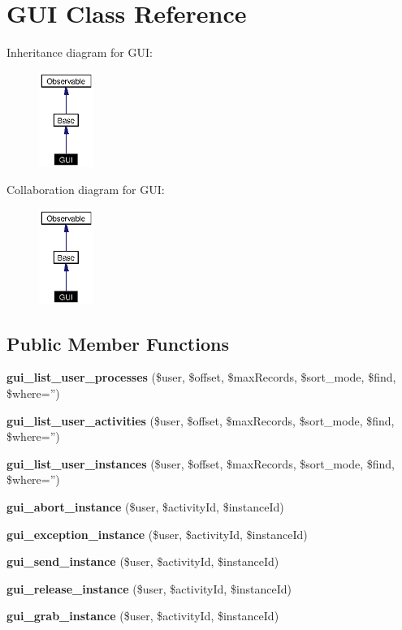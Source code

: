 \section{GUI Class Reference}
\label{classGUI}
Inheritance diagram for GUI:\begin{figure}[H]
\begin{center}
\leavevmode
\includegraphics[width=50pt]{classGUI__inherit__graph}
\end{center}
\end{figure}
Collaboration diagram for GUI:\begin{figure}[H]
\begin{center}
\leavevmode
\includegraphics[width=50pt]{classGUI__coll__graph}
\end{center}
\end{figure}
\subsection*{Public Member Functions}
\begin{CompactItemize}
\item 
{\bf gui\_\-list\_\-user\_\-processes} (\$user, \$offset, \$max\-Records, \$sort\_\-mode, \$find, \$where='')
\item 
{\bf gui\_\-list\_\-user\_\-activities} (\$user, \$offset, \$max\-Records, \$sort\_\-mode, \$find, \$where='')\label{classGUI_a1}

\item 
{\bf gui\_\-list\_\-user\_\-instances} (\$user, \$offset, \$max\-Records, \$sort\_\-mode, \$find, \$where='')\label{classGUI_a2}

\item 
{\bf gui\_\-abort\_\-instance} (\$user, \$activity\-Id, \$instance\-Id)\label{classGUI_a3}

\item 
{\bf gui\_\-exception\_\-instance} (\$user, \$activity\-Id, \$instance\-Id)\label{classGUI_a4}

\item 
{\bf gui\_\-send\_\-instance} (\$user, \$activity\-Id, \$instance\-Id)\label{classGUI_a5}

\item 
{\bf gui\_\-release\_\-instance} (\$user, \$activity\-Id, \$instance\-Id)\label{classGUI_a6}

\item 
{\bf gui\_\-grab\_\-instance} (\$user, \$activity\-Id, \$instance\-Id)\label{classGUI_a7}

\end{CompactItemize}


